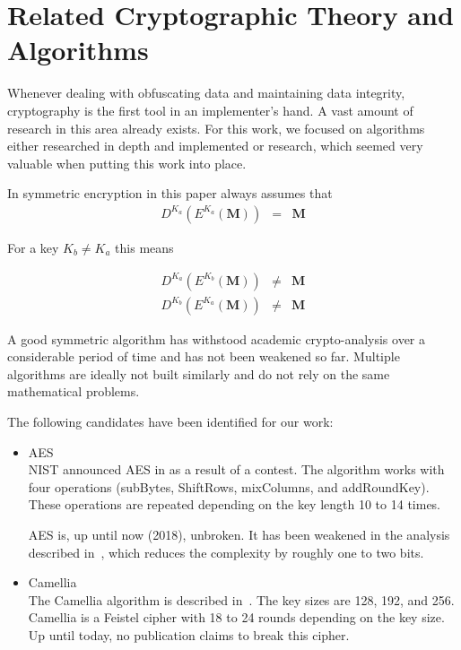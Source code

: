 \chapter{Related Cryptographic Theory and Algorithms}\label{sec:cryptoResearch}

Whenever dealing with obfuscating data and maintaining data integrity, cryptography is the first tool in an implementer's hand. A vast amount of research in this area already exists. For this work, we focused on algorithms either researched in depth and implemented or research, which seemed very valuable when putting this work into place. 

In symmetric encryption in this paper always assumes that
\begin{eqnarray}
	D^{K_a}\left(E^{K_a}\left(\mathbf{M}\right)\right) & = & \mathbf{M}
\end{eqnarray} 

For a key $K_b\neq K_a$ this means

\begin{eqnarray}
	D^{K_a}\left(E^{K_b}\left(\mathbf{M}\right)\right) & \neq & \mathbf{M}\\
	D^{K_b}\left(E^{K_a}\left(\mathbf{M}\right)\right) & \neq & \mathbf{M}
\end{eqnarray} 

A good symmetric algorithm has withstood academic crypto-analysis over a considerable period of time and has not been weakened so far. Multiple algorithms are ideally not built similarly and do not rely on the same mathematical problems.

The following candidates have been identified for our work:
\begin{itemize}
	\item AES\\
	NIST announced AES in \citeyear{standard2001announcing} as a result of a contest. The algorithm works with four operations (subBytes, ShiftRows, mixColumns, and addRoundKey). These operations are repeated depending on the key length 10 to 14 times. 
	
	AES is, up until now (2018), unbroken. It has been weakened in the analysis described in~\cite{tao2015improving}, which reduces the complexity by roughly one to two bits. 
	
	\item Camellia\\
	The Camellia algorithm is described in~\cite{rfc3713}. The key sizes are 128, 192, and 256. Camellia is a Feistel cipher with 18 to 24 rounds depending on the key size. Up until today, no publication claims to break this cipher. 
\end{itemize}

